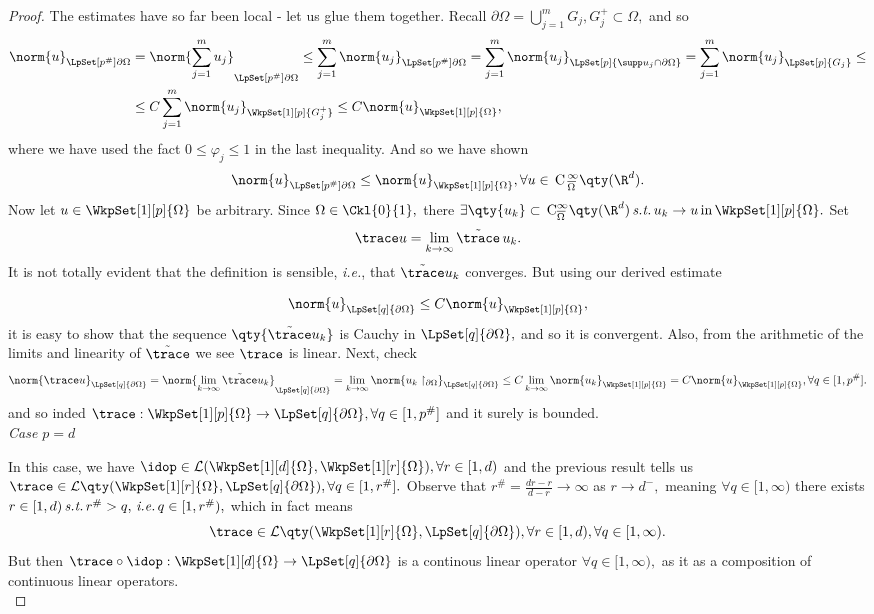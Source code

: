 \begin{proof}
	The estimates have so far been local - let us glue them together. Recall $\partial \Omega = \bigcup_{j=1}^m G_j,G_j^+ \subset \Omega,$ and so
	\begin{align*}
		\norm{u}_{\LpSet[p^{\#}]{\partial \Omega}} &= \norm{\sum_{j=1}^m u_j}_{\LpSet[p^{\#}]{\partial \Omega}}\leq \sum_{j=1}^m \norm{u_j}_{\LpSet[p^{\#}]{\partial \Omega}} = \sum_{j=1}^m \norm{u_j}_{\LpSet[p]{\supp u_j \cap \partial \Omega}} = \sum_{j=1}^m \norm{u_j}_{\LpSet[p]{G_j}} \leq \\
		&\leq C \sum_{j=1}^m \norm{u_j}_{\WkpSet[1][p]{G_j^{+}}} \leq C \norm{u}_{\WkpSet[1][p]{\Omega}},
	\end{align*}
	where we have used the fact $0 \leq \varphi_j \leq 1$ in the last inequality. And so we have shown
	\[
		\norm{u}_{\LpSet[p^{\#}]{\partial \Omega}} \leq \norm{u}_{\WkpSet[1][p]{\Omega}}, \forall u \in \, \text{C} \,^{\infty}_{\overline{\Omega}}\qty(\R^{d}).
	\]
	Now let $u \in \WkpSet[1][p]{\Omega}$ be arbitrary. Since $\Omega \in \Ckl{0}{1},$ there $\exists \qty{u_k} \subset \, \text{C}^{\infty}_{\overline{\Omega}}\qty(\R^{d}) \, \text{\textit{s.t.}} \, u_k \to u \, \text{in} \, \WkpSet[1][p]{\Omega}.$ Set
	\[
		\trace u = \lim_{k\to \infty}\tilde{\trace}\, u_k.
	\]
	It is not totally evident that the definition is sensible, \textit{i.e.}, that $\tilde{\trace} u_k$ converges. But using our derived estimate 

	\[
		\norm{u}_{\LpSet[q]{\partial \Omega}}\leq C \norm{u}_{\WkpSet[1][p]{\Omega}},
	\]
	it is easy to show that the sequence $\qty{\tilde{\trace}u_k}$ is Cauchy in $\LpSet[q]{\partial \Omega},$ and so it is convergent.
	Also, from the arithmetic of the limits and linearity of $\tilde{\trace}$ we see $\trace$ is linear. Next, check
	\[
		\norm{\trace u}_{\LpSet[q]{\partial \Omega}} = \norm{\lim_{k\to \infty}\tilde{\trace}u_k}_{\LpSet[q]{\partial \Omega}} = \lim_{k \to \infty}\norm{u_k \restriction_{\partial \Omega}}_{\LpSet[q]{\partial \Omega}} \leq C \lim_{k\to \infty}\norm{u_k}_{\WkpSet[1][p]{\Omega}} = C \norm{u}_{\WkpSet[1][p]{\Omega}}, \forall q \in [1, p^{\#}].
	\]
	and so inded $\trace: \WkpSet[1][p]{\Omega} \to \LpSet[q]{\partial \Omega}, \forall q \in [1,p^{\#}]$ and it surely is bounded. \\


	\textit{Case $p=d$} 

	In this case, we have $\idop \in \mathcal{L}(\WkpSet[1][d]{\Omega},\WkpSet[1][r]{\Omega}), \forall r \in [1,d)$ and the previous result tells us $\trace \in \mathcal{L}\qty(\WkpSet[1][r]{\Omega},\LpSet[q]{\partial \Omega}), \forall q \in [1,r^{\#}].$ Observe that $r^{\#} = \frac{dr-r}{d-r} \to \infty$ as $r \to d^-,$ meaning $\forall q \in [1, \infty)$ there exists $r \in [1,d) \, \text{\textit{s.t.}} \, r^{\#} > q, \, \text{\textit{i.e.}} \, q \in [1,r^{\#}),$ which in fact means
	\[
		\trace \in \mathcal{L}\qty(\WkpSet[1][r]{\Omega}, \LpSet[q]{\partial \Omega}),\forall r \in [1,d), \forall q \in [1,\infty).
	\]
	But then $\trace \circ \idop: \WkpSet[1][d]{\Omega} \to \LpSet[q]{\partial \Omega}$ is a continous linear operator $\forall q \in [1,\infty),$ as it as a composition of continuous linear operators.
	\\



\end{proof}
